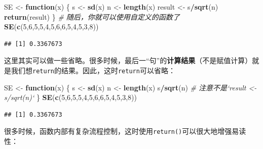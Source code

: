 \documentclass[]{book}
\newenvironment{Shaded}{\begin{snugshade}}{\end{snugshade}}
\newcommand{\CommentTok}[1]{\textcolor[rgb]{0.56,0.35,0.01}{\textit{#1}}}
\newcommand{\ControlFlowTok}[1]{\textcolor[rgb]{0.13,0.29,0.53}{\textbf{#1}}}
\newcommand{\DecValTok}[1]{\textcolor[rgb]{0.00,0.00,0.81}{#1}}
\newcommand{\KeywordTok}[1]{\textcolor[rgb]{0.13,0.29,0.53}{\textbf{#1}}}
\newcommand{\NormalTok}[1]{#1}
\newcommand{\OperatorTok}[1]{\textcolor[rgb]{0.81,0.36,0.00}{\textbf{#1}}}
\newcommand{\StringTok}[1]{\textcolor[rgb]{0.31,0.60,0.02}{#1}}
\begin{document}
\begin{Shaded}
\begin{Highlighting}[]
\NormalTok{SE <-}\StringTok{ }\ControlFlowTok{function}\NormalTok{(x) \{}
\NormalTok{  s <-}\StringTok{ }\KeywordTok{sd}\NormalTok{(x)}
\NormalTok{  n <-}\StringTok{ }\KeywordTok{length}\NormalTok{(x)}
\NormalTok{  result <-}\StringTok{ }\NormalTok{s}\OperatorTok{/}\KeywordTok{sqrt}\NormalTok{(n)}
  \KeywordTok{return}\NormalTok{(result)}
\NormalTok{\}}
\CommentTok{# 随后，你就可以使用自定义的函数了}
\KeywordTok{SE}\NormalTok{(}\KeywordTok{c}\NormalTok{(}\DecValTok{5}\NormalTok{,}\DecValTok{6}\NormalTok{,}\DecValTok{5}\NormalTok{,}\DecValTok{5}\NormalTok{,}\DecValTok{4}\NormalTok{,}\DecValTok{5}\NormalTok{,}\DecValTok{6}\NormalTok{,}\DecValTok{6}\NormalTok{,}\DecValTok{5}\NormalTok{,}\DecValTok{4}\NormalTok{,}\DecValTok{5}\NormalTok{,}\DecValTok{3}\NormalTok{,}\DecValTok{8}\NormalTok{)) }
\end{Highlighting}
\end{Shaded}

\begin{verbatim}
## [1] 0.3367673
\end{verbatim}

这里其实可以做一些省略。很多时候，最后一``句''的\textbf{计算结果}（不是赋值计算）就是我们想\texttt{return}的结果。因此，这时\texttt{return}可以省略：

\begin{Shaded}
\begin{Highlighting}[]
\NormalTok{SE <-}\StringTok{ }\ControlFlowTok{function}\NormalTok{(x) \{}
\NormalTok{  s <-}\StringTok{ }\KeywordTok{sd}\NormalTok{(x)}
\NormalTok{  n <-}\StringTok{ }\KeywordTok{length}\NormalTok{(x)}
\NormalTok{  s}\OperatorTok{/}\KeywordTok{sqrt}\NormalTok{(n) }\CommentTok{# 注意不是`result <- s/sqrt(n)`}
\NormalTok{\}}
\KeywordTok{SE}\NormalTok{(}\KeywordTok{c}\NormalTok{(}\DecValTok{5}\NormalTok{,}\DecValTok{6}\NormalTok{,}\DecValTok{5}\NormalTok{,}\DecValTok{5}\NormalTok{,}\DecValTok{4}\NormalTok{,}\DecValTok{5}\NormalTok{,}\DecValTok{6}\NormalTok{,}\DecValTok{6}\NormalTok{,}\DecValTok{5}\NormalTok{,}\DecValTok{4}\NormalTok{,}\DecValTok{5}\NormalTok{,}\DecValTok{3}\NormalTok{,}\DecValTok{8}\NormalTok{)) }
\end{Highlighting}
\end{Shaded}

\begin{verbatim}
## [1] 0.3367673
\end{verbatim}

很多时候，函数内部有复杂流程控制，这时使用\texttt{return()}可以很大地增强易读性：
\end{document}
